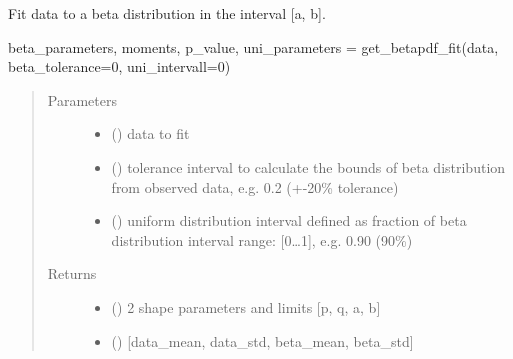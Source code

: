 \documentclass[letterpaper,10pt,english,openany,oneside]{sphinxmanual}
\begin{document}
\begin{fulllineitems}
\label{\detokenize{pygpc:pygpc.misc.get_betapdf_fit}}
Fit data to a beta distribution in the interval {[}a, b{]}.

beta\_parameters, moments, p\_value, uni\_parameters = get\_betapdf\_fit(data, beta\_tolerance=0, uni\_intervall=0)
\begin{quote}\begin{description}
\item[{Parameters}] \leavevmode\begin{itemize}
\item {} 
 () \textendash{} data to fit

\item {} 
 (\sphinxstyleliteralemphasis{\sphinxupquote{, }}\sphinxstyleliteralemphasis{\sphinxupquote{, }}) \textendash{} tolerance interval to calculate the bounds of beta distribution
from observed data, e.g. 0.2 (+-20\% tolerance)

\item {} 
 (\sphinxstyleliteralemphasis{\sphinxupquote{, }}\sphinxstyleliteralemphasis{\sphinxupquote{, }}) \textendash{} uniform distribution interval defined as fraction of
beta distribution interval
range: {[}0…1{]}, e.g. 0.90 (90\%)

\end{itemize}

\item[{Returns}] \leavevmode
\begin{itemize}
\item {} 
 () \textendash{} 2 shape parameters and limits
{[}p, q, a, b{]}

\item {} 
 () \textendash{} {[}data\_mean, data\_std, beta\_mean, beta\_std{]}


\end{itemize}
\end{description}
\end{quote}
\end{fulllineitems}
\end{document}
